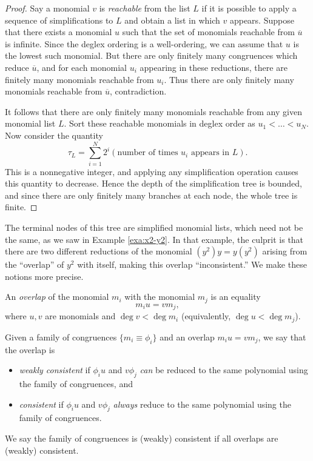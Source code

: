 \begin{proof}
	Say a monomial $v$ is \emph{reachable} from the list $L$ if it is possible to apply a sequence of simplifications to $L$ and obtain a list in which $v$ appears. Suppose that there exists a monomial $u$ such that the set of monomials reachable from $\overline{u}$ is infinite. Since the deglex ordering is a well-ordering, we can assume that $u$ is the lowest such monomial. But there are only finitely many congruences which reduce $\overline{u}$, and for each monomial $u_i$ appearing in these reductions, there are finitely many monomials reachable from $u_i$. Thus there are only finitely many monomials reachable from $\overline{u}$, contradiction.
	
	It follows that there are only finitely many monomials reachable from any given monomial list $L$. Sort these reachable monomials in deglex order as $u_1 < \ldots < u_N$. Now consider the quantity
	\[
		\tau_L = \sum_{i=1}^N 2^i (\text{number of times }u_i \text{ appears in }L).
	\]
	This is a nonnegative integer, and applying any simplification operation causes this quantity to decrease. Hence the depth of the simplification tree is bounded, and since there are only finitely many branches at each node, the whole tree is finite.
\end{proof}
The terminal nodes of this tree are simplified monomial lists, which need not be the same, as we saw in Example \ref{exa:x2-y2}. In that example, the culprit is that there are two different reductions of the monomial $(y^2) y = y (y^2)$ arising from the ``overlap'' of $y^2$ with itself, making this overlap ``inconsistent.'' We make these notions more precise.
\begin{defn}\label{def:overlap}
	An \emph{overlap} of the monomial $m_i$ with the monomial $m_j$ is an equality
	\[
	m_i u = v m_j,
	\]
	where $u,v$ are monomials and $\deg v < \deg m_i$ (equivalently, $\deg u < \deg m_j$).
\end{defn}
\begin{defn}\label{def:consistent}
	Given a family of congruences $\{m_i \equiv \phi_i\}$ and an overlap $m_i u = v m_j$, we say that the overlap is
	\begin{itemize}
		\item \emph{weakly consistent} if $\phi_i u$ and $v \phi_j$ \emph{can} be reduced to the same polynomial using the family of congruences, and
		\item \emph{consistent} if $\phi_i u$ and $v \phi_j$ \emph{always} reduce to the same polynomial using the family of congruences.
	\end{itemize}
	We say the family of congruences is (weakly) consistent if all overlaps are (weakly) consistent.
\end{defn}
